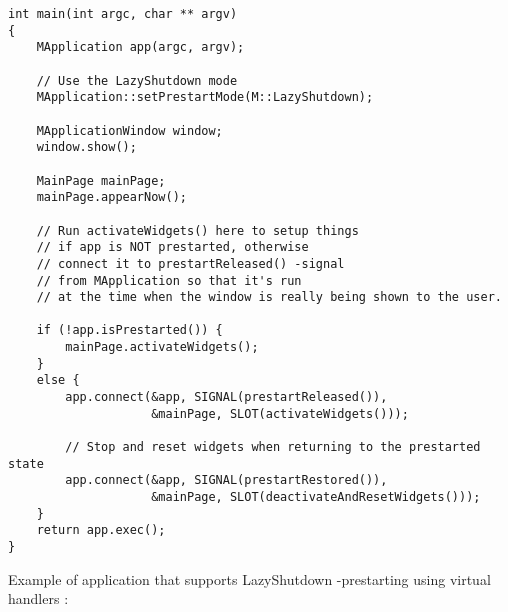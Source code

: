 \documentclass[a4paper]{article}
\begin{document}
\begin{verbatim}
int main(int argc, char ** argv)
{
    MApplication app(argc, argv);

    // Use the LazyShutdown mode
    MApplication::setPrestartMode(M::LazyShutdown);

    MApplicationWindow window;
    window.show();

    MainPage mainPage;
    mainPage.appearNow();

    // Run activateWidgets() here to setup things 
    // if app is NOT prestarted, otherwise
    // connect it to prestartReleased() -signal 
    // from MApplication so that it's run
    // at the time when the window is really being shown to the user.

    if (!app.isPrestarted()) {
        mainPage.activateWidgets();
    }
    else {
        app.connect(&app, SIGNAL(prestartReleased()), 
                    &mainPage, SLOT(activateWidgets()));

        // Stop and reset widgets when returning to the prestarted state
        app.connect(&app, SIGNAL(prestartRestored()), 
                    &mainPage, SLOT(deactivateAndResetWidgets()));
    }
    return app.exec();
}
\end{verbatim}

Example of application that supports LazyShutdown -prestarting using virtual handlers :
\end{document}
